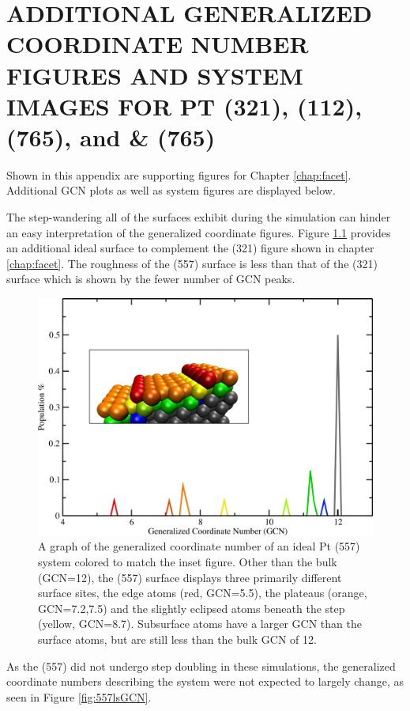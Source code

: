 
\chapter{ADDITIONAL GENERALIZED COORDINATE NUMBER FIGURES AND SYSTEM IMAGES FOR PT (321), (112), (765), and \& (765)}
\label{app:SI2}


Shown in this appendix are supporting figures for Chapter \ref{chap:facet}.
Additional GCN plots as well as system figures are displayed below.
\newpage



The step-wandering all of the surfaces exhibit during the simulation can hinder
an easy interpretation of the generalized coordinate figures. Figure
\ref{fig:557GCN} provides an additional ideal surface to complement the (321)
figure shown in chapter \ref{chap:facet}. The roughness of the (557) surface is
less than that of the (321) surface which is shown by the fewer number of GCN
peaks. 

\begin{figure}
\centering
\includegraphics[width=0.9\linewidth]{../figures/appB/557_ideal_gcn.pdf}
\caption{A graph of the generalized coordinate number of an ideal Pt (557)
system colored to match the inset figure. Other than the bulk (GCN=12), the
(557) surface displays three primarily different surface sites, the edge atoms
(red, GCN=5.5), the plateaus (orange, GCN=7.2,7.5) and the slightly eclipsed
atoms beneath the step (yellow, GCN=8.7). Subsurface atoms have a larger GCN
than the surface atoms, but are still less than the bulk GCN of 12.}
\label{fig:557GCN}
\end{figure}
\newpage


As the  (557) did not undergo step doubling in these simulations, the
generalized coordinate numbers describing the system were not expected to
largely change, as seen in Figure \ref{fig:557lsGCN}.

